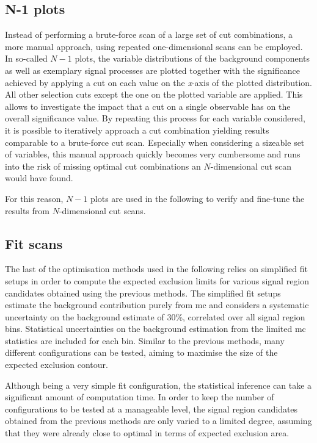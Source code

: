 \subsection{N-1 plots}\label{sec:n-1-scan}

Instead of performing a brute-force scan of a large set of cut combinations, a more manual approach, using repeated one-dimensional scans can be employed. In so-called $N-1$ plots, the variable distributions of the background components as well as exemplary signal processes are plotted together with the significance achieved by applying a cut on each value on the \textit{x}-axis of the plotted distribution. All other selection cuts except the one on the plotted variable are applied. This allows to investigate the impact that a cut on a single observable has on the overall significance value. By repeating this process for each variable considered, it is possible to iteratively approach a cut combination yielding results comparable to a brute-force cut scan. Especially when considering a sizeable set of variables, this manual approach quickly becomes very cumbersome and runs into the risk of missing optimal cut combinations an $N$-dimensional cut scan would have found.

For this reason, $N-1$ plots are used in the following to verify and fine-tune the results from $N$-dimensional cut scans.
 
\subsection{Fit scans}\label{sec:fit-scan}

The last of the optimisation methods used in the following relies on simplified fit setups in order to compute the expected exclusion limits for various signal region candidates obtained using the previous methods. The simplified fit setups estimate the background contribution purely from \gls{mc} and considers a systematic uncertainty on the background estimate of 30\%, correlated over all signal region bins. Statistical uncertainties on the background estimation from the limited \gls{mc} statistics are included for each bin. Similar to the previous methods, many different configurations can be tested, aiming to maximise the size of the expected exclusion contour.

Although being a very simple fit configuration, the statistical inference can take a significant amount of computation time. In order to keep the number of configurations to be tested at a manageable level, the signal region candidates obtained from the previous methods are only varied to a limited degree, assuming that they were already close to optimal in terms of expected exclusion area.

